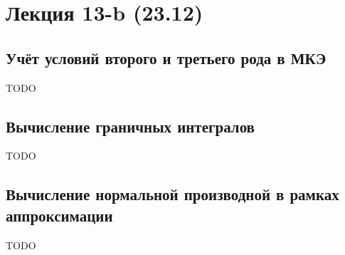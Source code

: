 \section{Лекция 13-b (23.12)}
\subsection{Учёт условий второго и третьего рода в МКЭ}
TODO
\subsection{Вычисление граничных интегралов}
TODO
\subsection{Вычисление нормальной производной в рамках аппроксимации}
TODO
